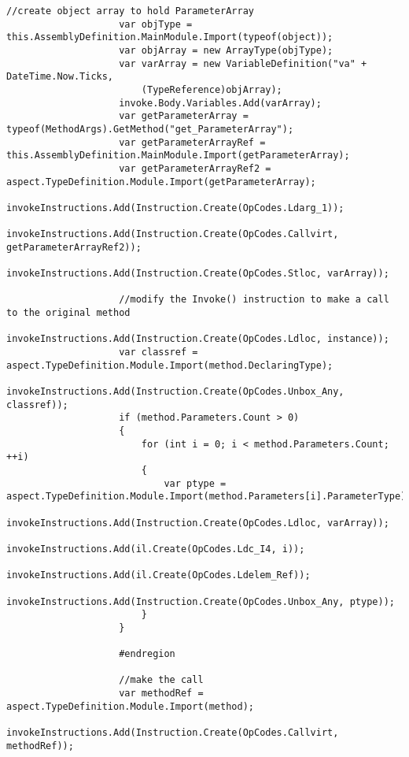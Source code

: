 \begin{lstlisting}[caption={../buffalo/Injectors/MethodAroundInjector.cs}, label=../buffalo/Injectors/MethodAroundInjector.cs, frame=tb, basicstyle=\scriptsize]
                    //create object array to hold ParameterArray
                    var objType = this.AssemblyDefinition.MainModule.Import(typeof(object));
                    var objArray = new ArrayType(objType);
                    var varArray = new VariableDefinition("va" + DateTime.Now.Ticks,
                        (TypeReference)objArray);
                    invoke.Body.Variables.Add(varArray);
                    var getParameterArray = typeof(MethodArgs).GetMethod("get_ParameterArray");
                    var getParameterArrayRef = this.AssemblyDefinition.MainModule.Import(getParameterArray);
                    var getParameterArrayRef2 = aspect.TypeDefinition.Module.Import(getParameterArray);
                    invokeInstructions.Add(Instruction.Create(OpCodes.Ldarg_1));
                    invokeInstructions.Add(Instruction.Create(OpCodes.Callvirt, getParameterArrayRef2));
                    invokeInstructions.Add(Instruction.Create(OpCodes.Stloc, varArray));

                    //modify the Invoke() instruction to make a call to the original method
                    invokeInstructions.Add(Instruction.Create(OpCodes.Ldloc, instance));
                    var classref = aspect.TypeDefinition.Module.Import(method.DeclaringType);
                    invokeInstructions.Add(Instruction.Create(OpCodes.Unbox_Any, classref));
                    if (method.Parameters.Count > 0)
                    {
                        for (int i = 0; i < method.Parameters.Count; ++i)
                        {
                            var ptype = aspect.TypeDefinition.Module.Import(method.Parameters[i].ParameterType);
                            invokeInstructions.Add(Instruction.Create(OpCodes.Ldloc, varArray));
                            invokeInstructions.Add(il.Create(OpCodes.Ldc_I4, i));
                            invokeInstructions.Add(il.Create(OpCodes.Ldelem_Ref));
                            invokeInstructions.Add(Instruction.Create(OpCodes.Unbox_Any, ptype));
                        }
                    }

                    #endregion

                    //make the call
                    var methodRef = aspect.TypeDefinition.Module.Import(method);
                    invokeInstructions.Add(Instruction.Create(OpCodes.Callvirt, methodRef));


\end{lstlisting}

